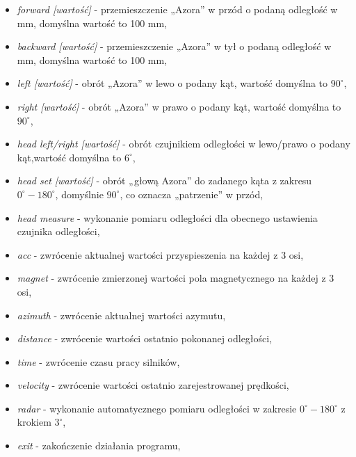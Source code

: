         \begin{itemize}
            \item \textit{forward [wartość]}            - przemieszczenie „Azora” w przód o podaną odległość w mm, domyślna wartość to 100 mm,
            \item \textit{backward [wartość]}           - przemieszczenie „Azora” w tył o podaną odległość w mm, domyślna wartość to 100 mm,
            \item \textit{left [wartość]}               - obrót „Azora” w lewo o podany kąt, wartość domyślna to $90^\circ$,
            \item \textit{right [wartość]}              - obrót „Azora” w prawo o podany kąt, wartość domyślna to $90^\circ$,
            \item \textit{head left/right [wartość]}    - obrót czujnikiem odległości w lewo/prawo o podany kąt,wartość domyślna to $6^\circ$,
            \item \textit{head set [wartość]}           - obrót „głową Azora” do zadanego kąta z zakresu $0^\circ-180^\circ$, domyślnie $90^\circ$, co oznacza „patrzenie” w przód,
            \item \textit{head measure}                 - wykonanie pomiaru odległości dla obecnego ustawienia czujnika odległości,
            \item \textit{acc}                          - zwrócenie aktualnej wartości przyspieszenia na każdej z 3 osi,
            \item \textit{magnet}                       - zwrócenie zmierzonej wartości pola magnetycznego na każdej z 3 osi,
            \item \textit{azimuth}                      - zwrócenie aktualnej wartości azymutu,
            \item \textit{distance}                     - zwrócenie wartości ostatnio pokonanej odległości,
            \item \textit{time}                         - zwrócenie czasu pracy silników,
            \item \textit{velocity}                     - zwrócenie wartości ostatnio zarejestrowanej prędkości,
            \item \textit{radar}                        - wykonanie automatycznego pomiaru odległości w zakresie $0^\circ-180^\circ$ z krokiem $3^\circ$,
            \item \textit{exit}                         - zakończenie działania programu,
        \end{itemize}
    